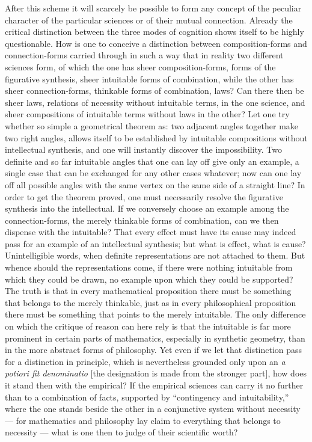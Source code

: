 \documentclass[12pt]{book}
\begin{document}
After this scheme it will scarcely be possible to form any concept of the
peculiar character of the particular sciences or of their mutual connection.
Already the critical distinction between the three modes of cognition shows
itself to be highly questionable. How is one to conceive a distinction between
composition-forms and connection-forms carried through in such a way that in
reality two different sciences form, of which the one has sheer
composition-forms, forms of the figurative synthesis, sheer intuitable forms of
combination, while the other has sheer connection-forms, thinkable forms of
combination, laws? Can there then be sheer laws, relations of necessity without
intuitable terms, in the one science, and sheer compositions of intuitable
terms without laws in the other? Let one try whether so simple a geometrical
theorem as: two adjacent angles together make two right angles, allows itself to
be established by intuitable compositions without intellectual synthesis, and one
will instantly discover the impossibility. Two definite and so far intuitable
angles that one can lay off give only an example, a single case that can be
exchanged for any other cases whatever; now can one lay off all possible angles
with the same vertex on the same side of a straight line? In order to get the
theorem proved, one must necessarily resolve the figurative synthesis into the
intellectual. If we conversely choose an example among the connection-forms, the
merely thinkable forms of combination, can we then dispense with the
intuitable? That every effect must have its cause may indeed pass for an example
of an intellectual synthesis; but what is effect, what is cause? Unintelligible
words, when definite representations are not attached to them. But whence should
the representations come, if there were nothing intuitable from which they could
be drawn, no example upon which they could be supported? The truth is that in
every mathematical proposition there must be something that belongs to the
merely thinkable, just as in every philosophical proposition there must be
something that points to the merely intuitable. The only difference on which the
critique of reason can here rely is that the intuitable is far more prominent in
certain parts of mathematics, especially in synthetic geometry, than in the more
abstract forms of philosophy. Yet even if we let that distinction pass for a
distinction in principle, which is nevertheless grounded only upon an \textit{a
potiori fit denominatio} [the designation is made from the stronger part], how
does it stand then with the empirical? If the empirical sciences can carry it no
further than to a combination of facts, supported by ``contingency and
intuitability,'' where the one stands beside the other in a conjunctive system
without necessity --- for mathematics and philosophy lay claim to everything
that belongs to necessity --- what is one then to judge of their scientific
worth?
\end{document}
